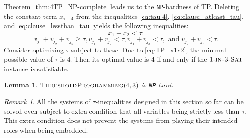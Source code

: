 \documentclass{article}
\newtheorem{lemma}[theorem]{Lemma}
\theoremstyle{remark}
\newtheorem{remark}[theorem]{Remark}
\theoremstyle{definition}
\newcommand{\SAT}{\ensuremath{\mbox{\sc Sat}}}
\newcommand{\oneinthree}{\ensuremath{\mbox{\sc 1-in-3-\SAT}}}
\newcommand{\TP}{\ensuremath{\mbox{\sc ThresholdProgramming}}}
\newcommand{\NP}{{\tt NP}}
\begin{document}
Theorem~\ref{thm:4TP_NP-complete} leads us to the \NP-hardness of TP. 
Deleting the constant term $x_{\tau-4}$ from the inequalities \eqref{eq:tau-4}, \eqref{eq:clause_atleast_tau}, and \eqref{eq:clause_lessthan_tau} yields the following inequalities:  
\begin{equation}\label{eq:TP_x1x2}
	x_1 + x_2 < \tau, 
\end{equation}
\begin{equation}\label{eq:TP_jth_clause_lessthan_tau}
	v_{j_1} + v_{j_2} + v_{j_3} \ge \tau, v_{j_1} + v_{j_2} < \tau, v_{j_1} + v_{j_3} < \tau, \mbox{ and } v_{j_2} + v_{j_3} < \tau. 
\end{equation}
Consider optimizing $\tau$ subject to these. 
Due to \eqref{eq:TP_x1x2}, the minimal possible value of $\tau$ is 4. 
Then its optimal value is 4 if and only if the $\oneinthree$ instance is satisfiable. 

\begin{lemma}\label{lem:TP43_NPhard}
	$\TP(4, 3)$ is \NP-hard. 
\end{lemma}

\begin{remark}\label{rmk:strictly_lessthan_tau}
	All the systems of $\tau$-inequalities designed in this section so far can be solved even subject to extra condition that all variables being strictly less than $\tau$. 
	This extra condition does not prevent the systems from playing their intended roles when being embedded. 
\end{remark}
\end{document}
